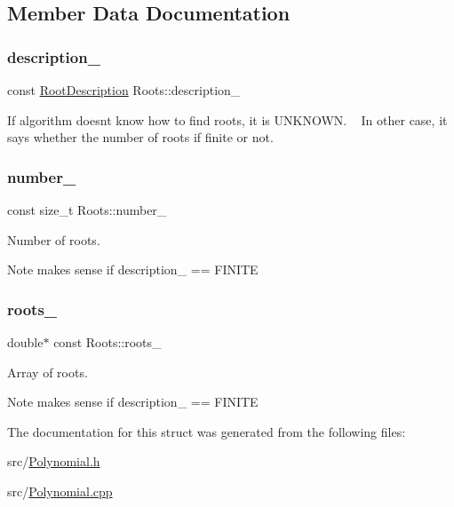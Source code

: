 \subsection{Member Data Documentation}
\mbox{\label{struct_roots_ac5b01dd8b179332c71dfb2dce785fae0}} 
\subsubsection{\texorpdfstring{description\+\_\+}{description\_}}
{\footnotesize\ttfamily const \mbox{\hyperlink{_polynomial_8h_a4d41a8f81d16e61db1ddcce54a5f2586}{Root\+Description}} Roots\+::description\+\_\+}

If algorithm doesn\textquotesingle{}t know how to find roots, it is U\+N\+K\+N\+O\+WN. ~\newline
 In other case, it says whether the number of roots if finite or not. \mbox{\label{struct_roots_ad9095b5cdb111b3aa65f3c8a6b2e7ffa}} 
\subsubsection{\texorpdfstring{number\+\_\+}{number\_}}
{\footnotesize\ttfamily const size\+\_\+t Roots\+::number\+\_\+}

Number of roots. \begin{DoxyNote}{Note}
makes sense if description\+\_\+ == F\+I\+N\+I\+TE 
\end{DoxyNote}
\mbox{\label{struct_roots_a00965d33c485ae90b7a39897f5d294ca}} 
\subsubsection{\texorpdfstring{roots\+\_\+}{roots\_}}
{\footnotesize\ttfamily double$\ast$ const Roots\+::roots\+\_\+}

Array of roots. \begin{DoxyNote}{Note}
makes sense if description\+\_\+ == F\+I\+N\+I\+TE 
\end{DoxyNote}


The documentation for this struct was generated from the following files\+:\begin{DoxyCompactItemize}
\item 
src/\mbox{\hyperlink{_polynomial_8h}{Polynomial.\+h}}\item 
src/\mbox{\hyperlink{_polynomial_8cpp}{Polynomial.\+cpp}}\end{DoxyCompactItemize}
